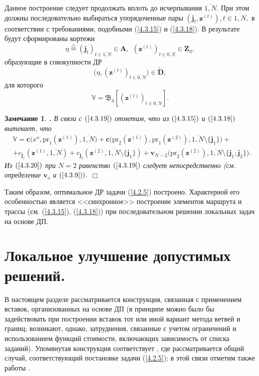 \documentclass[11pt,twoside,openany]{report}
\newcommand{\bfn}{\begin{equation}}
\newcommand{\efn}{\end{equation}}
\newcommand{\df}{\stackrel{\triangle}{=}}
\newcommand{\ov}{\overline}
\newcounter{theo}
\newcounter{zam}
\newtheorem{zam}{Замечание}[section]
\newcommand{\TL}{\mbox{\bf{$\!\!$.}}}
\newcommand{\sm}{\setminus}
\begin{document}
{$$$$
Данное построение следует продолжать вплоть до исчерпывания $\ov{1,N}.$ При этом должны
последовательно выбираться упорядоченные пары $(\mathbf{j}_t,\mathbf{z}^{(t)}), t\in \ov{1,N},$
в соответствии с требованиями, подобными (\ref{4.3.15}) и (\ref{4.3.18}). В результате будут
сформированы кортежи
$$\eta\df (\mathbf{j}_t)_{t\in\ov{1,N}}\in \mathbf{A},\ \ (\mathbf{z}^{(t)})_{t\in \ov{0,N}}\in \mathbf{Z}_\eta,
$$
образующие в совокупности ДР
$$\bigl(\eta, (\mathbf{z}^{(t)})_{t\in \ov{0,N}}\bigl)\in \widetilde{\mathbf{D}},
$$
для которого
\bfn\label{4.3.19} \mathbb{V}= \mathfrak{B}_\eta[(\mathbf{z}^{(t)})_{t\in \ov{0,N}}].
\efn
\begin{zam}\label{z4.3.1}{\TL}
 В связи с $(\ref{4.3.19})$ отметим, что из $(\ref{4.3.15})$ и $(\ref{4.3.18})$ вытекает, что
\begin{eqnarray}
& \mathbb{V}=\mathbf{c}\bigl(x^o,\mathrm{pr}_1(\mathbf{z}^{(1)}),\ov{1,N}\bigl) +
\mathbf{c}\bigl(\mathrm{pr}_2(\mathbf{z}^{(1)}), \mathrm{pr}_1(\mathbf{z}^{(2)}),\ov{1,N}\sm
\{\mathbf{j}_1\}) +
&\nonumber\\
&+  c_{\mathbf{j}_1}(\mathbf{z}^{(1)},\ov{1,N}) +
c_{\mathbf{j}_2}(\mathbf{z}^{(2)},
\ov{1,N}\sm\{\mathbf{j}_1 \}) +
\mathbf{v}_{N-2}\bigl(\mathrm{pr}_2(\mathbf{z}^{(2)}),\ov{1,N}\sm\{\mathbf{j}_1;\mathbf{j}_2\}\bigl).
&\label{4.3.20}
\end{eqnarray}
 Из $(\ref{4.3.20})$ при $N=2$ равенство $(\ref{4.3.19})$ следует непосредственно (см.
определение $\mathbf{v}_o$ и $(\ref{4.3.9})).$
 \hfill $\Box$
 \end{zam}

Таким образом, оптимальное ДР задачи (\ref{4.2.5}) построено. Характерной его особенностью является
<<синхронное>> построение элементов маршрута и трассы (см. (\ref{4.3.15}), (\ref{4.3.18})) при
последовательном решении локальных задач на основе ДП.


\section{Локальное улучшение допустимых решений.}
\setcounter{equation}{0}

В настоящем разделе рассматривается конструкция, связанная с применением вставок,
организованных на основе ДП (в принципе можно было бы задействовать при построении
вставок тот или иной вариант метода ветвей и границ; возникают, однако, затруднения,
связанные с учетом ограничений и использованием функций стоимости, включающих
зависимость от списка заданий). Упомянутая конструкция соответствует  \cite{Cha13`},
где рассматривается общий случай, соответствующий постановке задачи (\ref{4.2.5});
в этой связи отметим также работы   \cite{Cha14`,Cha15`}.

}
\end{document}

